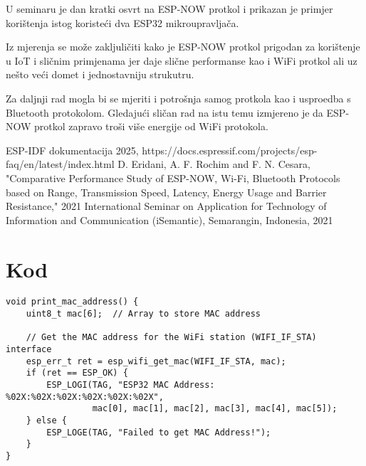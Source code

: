 \documentclass[seminarskirad]{fer}
\begin{document}
U seminaru je dan kratki osvrt na ESP-NOW protkol i prikazan je primjer korištenja istog koristeći dva ESP32 mikroupravljača. 

Iz mjerenja se može zakljuličiti kako je ESP-NOW protkol prigodan za korištenje u IoT i sličnim primjenama jer daje slične performanse kao i WiFi protkol ali uz nešto veći domet i jednostavniju strukutru.

Za daljnji rad mogla bi se mjeriti i potrošnja samog protkola kao i usproedba s Bluetooth protokolom. Gledajući sličan rad na istu temu \cite{b2} izmjereno je da ESP-NOW protkol zapravo troši više energije od WiFi protokola. 



\begin{thebibliography}{00}

 ESP-IDF dokumentacija 2025, https://docs.espressif.com/projects/esp-faq/en/latest/index.html
 D. Eridani, A. F. Rochim and F. N. Cesara, "Comparative Performance Study of ESP-NOW, Wi-Fi, Bluetooth Protocols based on Range, Transmission Speed, Latency, Energy Usage and Barrier Resistance," 2021 International Seminar on Application for Technology of Information and Communication (iSemantic), Semarangin, Indonesia, 2021

\end{thebibliography}



\backmatter

\chapter{Kod}

\begin{lstlisting}[caption=Dohvacanje MAC adrese] 
void print_mac_address() {
    uint8_t mac[6];  // Array to store MAC address

    // Get the MAC address for the WiFi station (WIFI_IF_STA) interface
    esp_err_t ret = esp_wifi_get_mac(WIFI_IF_STA, mac);
    if (ret == ESP_OK) {
        ESP_LOGI(TAG, "ESP32 MAC Address: %02X:%02X:%02X:%02X:%02X:%02X",
                 mac[0], mac[1], mac[2], mac[3], mac[4], mac[5]);
    } else {
        ESP_LOGE(TAG, "Failed to get MAC Address!");
    }
}
\end{lstlisting}
\end{document}
